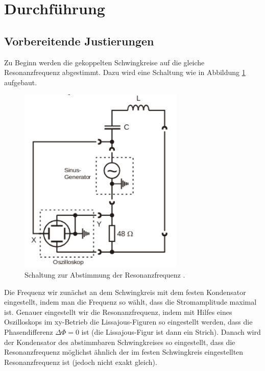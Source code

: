 \section{Durchführung}
\label{sec:Durchführung}
\subsection{Vorbereitende Justierungen}
Zu Beginn werden die gekoppelten Schwingkreise auf die gleiche Resonanzfrequenz
abgestimmt. Dazu wird eine Schaltung wie in Abbildung \ref{fig:abstimmung}
aufgebaut.
\begin{figure}
  \centering
  \includegraphics[width=0.7\textwidth]{abstimmung.png}
  \caption{Schaltung zur Abstimmung der Resonanzfrequenz \cite{sample}.}
  \label{fig:abstimmung}
\end{figure}
Die Frequenz wir zunächst an dem Schwingkreis mit dem festen Kondensator eingestellt,
indem man die Frequenz so wählt, dass die Stromamplitude maximal ist. Genauer
eingestellt wir die Resonanzfrequenz, indem mit Hilfes eines Oszilloskops im
xy-Betrieb die Lissajous-Figuren so eingestellt werden, dass die Phasendifferenz
$\Delta \Phi = 0$ ist (die Lissajous-Figur ist dann ein Strich). Danach wird der
Kondensator des abstimmbaren Schwingkreises so eingestellt, dass die Resonanzfrequenz
möglichst ähnlich der im festen Schwingkreis eingestellten Resonanzfrequenz ist
(jedoch nicht exakt gleich).

